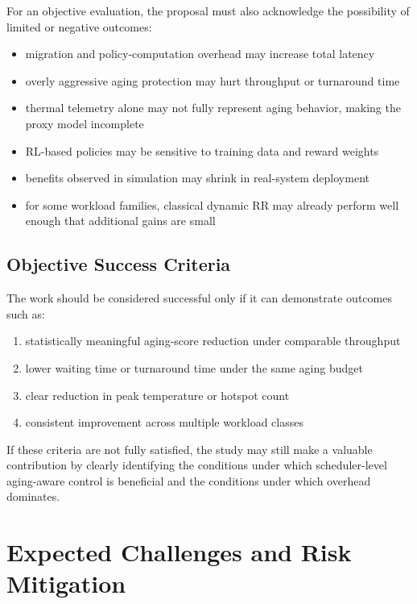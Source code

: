 \documentclass[12pt,a4paper]{article}
\begin{document}
For an objective evaluation, the proposal must also acknowledge the possibility of limited or negative outcomes:

\begin{itemize}[leftmargin=*]
\item migration and policy-computation overhead may increase total latency
\item overly aggressive aging protection may hurt throughput or turnaround time
\item thermal telemetry alone may not fully represent aging behavior, making the proxy model incomplete
\item RL-based policies may be sensitive to training data and reward weights
\item benefits observed in simulation may shrink in real-system deployment
\item for some workload families, classical dynamic RR may already perform well enough that additional gains are small
\end{itemize}

\subsection{Objective Success Criteria}

The work should be considered successful only if it can demonstrate outcomes such as:

\begin{enumerate}[leftmargin=*]
\item statistically meaningful aging-score reduction under comparable throughput
\item lower waiting time or turnaround time under the same aging budget
\item clear reduction in peak temperature or hotspot count
\item consistent improvement across multiple workload classes
\end{enumerate}

If these criteria are not fully satisfied, the study may still make a valuable contribution by clearly identifying the
conditions under which scheduler-level aging-aware control is beneficial and the conditions under which overhead dominates.

\section{Expected Challenges and Risk Mitigation}
\end{document}
